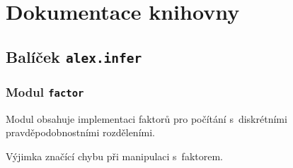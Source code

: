 
\chapter{Dokumentace knihovny}
\label{ap:doc}

\section{Balíček \texttt{alex.infer}}
\label{alex.infer::doc}\label{alex.infer:balicek-infer}

\subsection{Modul \texttt{factor}}
\label{alex.infer:modul-factor}\label{alex.infer:module-alex.infer.factor}
Modul {\hyperref[alex.infer:module-alex.infer.factor]{}} obsahuje implementaci faktorů pro počítání s~diskrétními pravděpodobnostními rozděleními.

\begin{fulllineitems}
\label{alex.infer:alex.infer.factor.FactorError}
Výjimka značící chybu při manipulaci s~faktorem.

\end{fulllineitems}


